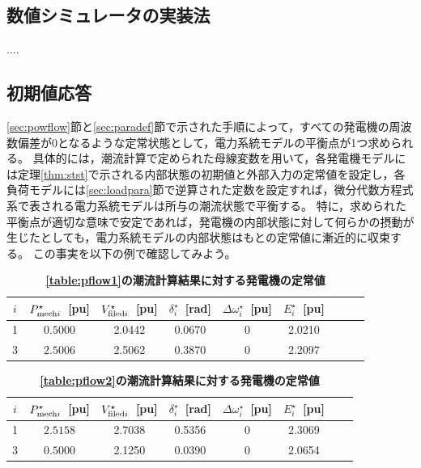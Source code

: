 \documentclass[tombow,dvipdfmx]{corona-a5-1.1}
\begin{document}
\subsection{数値シミュレータの実装法}
....

\subsection{初期値応答}

\ref{sec:powflow}節と\ref{sec:paradef}節で示された手順によって，すべての発電機の周波数偏差が0となるような定常状態として，電力系統モデルの平衡点が1つ求められる。
具体的には，潮流計算で定められた母線変数を用いて，各発電機モデルには定理\ref{thm:stst}で示される内部状態の初期値と外部入力の定常値を設定し，各負荷モデルには\ref{sec:loadpara}節で逆算された定数を設定すれば，微分代数方程式系で表される電力系統モデルは所与の潮流状態で平衡する。
特に，求められた平衡点が適切な意味で安定であれば，発電機の内部状態に対して何らかの摂動が生じたとしても，電力系統モデルの内部状態はもとの定常値に漸近的に収束する。
この事実を以下の例で確認してみよう。

\begin{table}[h]
\medskip
 \caption{\textbf{\ref{table:pflow1}の潮流計算結果に対する発電機の定常値}}
 \label{table:genst13a}
 \centering
  \begin{tabular}{ccccccccc}
   \hline
$i$ &  $P_{{\rm mech}i}^{\star}$~[pu] & $V_{{\rm filed}i}^{\star}$~[pu] & $\delta_i^{\star}$~[rad] & $\Delta \omega_i^{\star}$~[pu] & $E_i^{\star}$~[pu] \\
   \hline \hline
1 & $0.5000$ & 2.0442 & 0.0670 & 0 & 2.0210 \\
3 & $2.5006$ & 2.5062 & 0.3870 & 0 & 2.2097 \\
   \hline
  \end{tabular}
\end{table}

\begin{table}[h]
\medskip
 \caption{\textbf{\ref{table:pflow2}の潮流計算結果に対する発電機の定常値}}
 \label{table:genst13b}
 \centering
  \begin{tabular}{cccccccc}
   \hline
$i$ &  $P_{{\rm mech}i}^{\star}$~[pu] & $V_{{\rm filed}i}^{\star}$~[pu] & $\delta_i^{\star}$~[rad] & $\Delta \omega_i^{\star}$~[pu] & $E_i^{\star}$~[pu] \\
   \hline \hline
1 & $2.5158$ & 2.7038 & 0.5356 & 0 & 2.3069 \\
3 & $0.5000$ & 2.1250 & 0.0390 & 0 & 2.0654 \\
   \hline
  \end{tabular}
\end{table}
\end{document}
